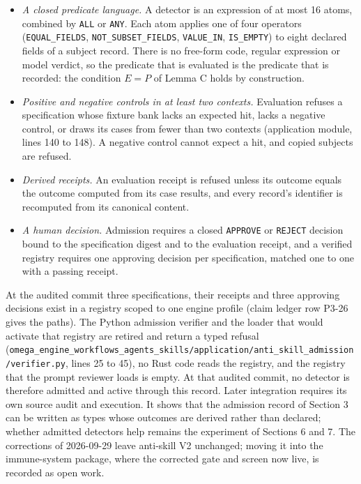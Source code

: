 \documentclass[
  11pt,
]{article}
\newcommand{\passthrough}[1]{#1}
\providecommand{\tightlist}{%
  \setlength{\itemsep}{0pt}\setlength{\parskip}{0pt}}
\begin{document}
\begin{itemize}
\tightlist
\item
  \emph{A closed predicate language.} A detector is an expression of at
  most 16 atoms, combined by \passthrough{\lstinline!ALL!} or
  \passthrough{\lstinline!ANY!}. Each atom applies one of four operators
  (\texttt{\nolinkurl{EQUAL_FIELDS}},
  \texttt{\nolinkurl{NOT_SUBSET_FIELDS}},
  \texttt{\nolinkurl{VALUE_IN}},
  \texttt{\nolinkurl{IS_EMPTY}}) to eight declared fields of a
  subject record. There is no free-form code, regular expression or
  model verdict, so the predicate that is evaluated is the predicate
  that is recorded: the condition \(E = P\) of Lemma C holds by
  construction.
\item
  \emph{Positive and negative controls in at least two contexts.}
  Evaluation refuses a specification whose fixture bank lacks an
  expected hit, lacks a negative control, or draws its cases from fewer
  than two contexts (application module, lines 140 to 148). A negative
  control cannot expect a hit, and copied subjects are refused.
\item
  \emph{Derived receipts.} An evaluation receipt is refused unless its
  outcome equals the outcome computed from its case results, and every
  record's identifier is recomputed from its canonical content.
\item
  \emph{A human decision.} Admission requires a closed
  \passthrough{\lstinline!APPROVE!} or \passthrough{\lstinline!REJECT!}
  decision bound to the specification digest and to the evaluation
  receipt, and a verified registry requires one approving decision per
  specification, matched one to one with a passing receipt.
\end{itemize}

At the audited commit three specifications, their receipts and three
approving decisions exist in a registry scoped to one engine profile
(claim ledger row P3-26 gives the paths). The Python admission verifier
and the loader that would activate that registry are retired and return
a typed refusal
(\texttt{\nolinkurl{omega_engine_workflows_agents_skills/application/anti_skill_admission/verifier.py}},
lines 25 to 45), no Rust code reads the registry, and the registry that
the prompt reviewer loads is empty. At that audited commit, no detector
is therefore admitted and active through this record. Later integration
requires its own source audit and execution. It shows that the admission
record of Section 3 can be written as types whose outcomes are derived
rather than declared; whether admitted detectors help remains the
experiment of Sections 6 and 7. The corrections of 2026-09-29 leave
anti-skill V2 unchanged; moving it into the immune-system package, where
the corrected gate and screen now live, is recorded as open work.
\end{document}
